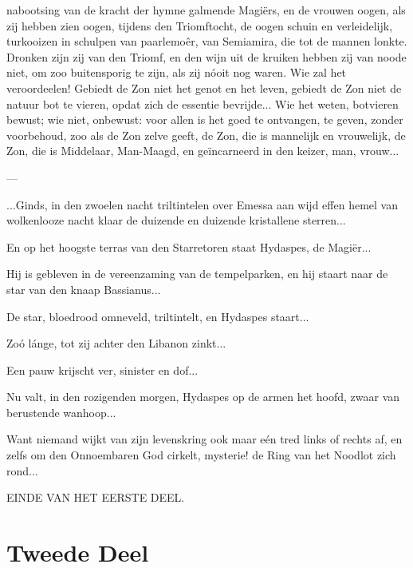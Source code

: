 \documentclass[a4paper, 12pt, oneside, dutch]{article}
\begin{document}
nabootsing van de kracht der hymne galmende Magiërs, en de vrouwen oogen, als zij hebben zien oogen, tijdens den Triomftocht, de oogen schuin en verleidelijk, turkooizen in schulpen van paarlemoêr, van Semiamira, die tot de mannen lonkte. Dronken zijn zij van den Triomf, en den wijn uit de kruiken hebben zij van noode niet, om zoo buitensporig te zijn, als zij nóoit nog waren. Wie zal het veroordeelen! Gebiedt de Zon niet het genot en het leven, gebiedt de Zon niet de natuur bot te vieren, opdat zich de essentie bevrijde... Wie het weten, botvieren bewust; wie niet, onbewust: voor allen is het goed te ontvangen, te geven, zonder voorbehoud, zoo als de Zon zelve geeft, de Zon, die is mannelijk en vrouwelijk, de Zon, die is Middelaar, Man-Maagd, en geïncarneerd in den keizer, man, vrouw...

---

...Ginds, in den zwoelen nacht triltintelen over Emessa aan wijd effen hemel van wolkenlooze nacht klaar de duizende en duizende kristallene sterren...

En op het hoogste terras van den Starretoren staat Hydaspes, de Magiër...

Hij is gebleven in de vereenzaming van de tempelparken, en hij staart naar de star van den knaap Bassianus...

De star, bloedrood omneveld, triltintelt, en Hydaspes staart...

Zoó lánge, tot zij achter den Libanon zinkt...

Een pauw krijscht ver, sinister en dof...

Nu valt, in den rozigenden morgen, Hydaspes op de armen het hoofd, zwaar van berustende wanhoop...

Want niemand wijkt van zijn levenskring ook maar eén tred links of rechts af, en zelfs om den Onnoembaren God cirkelt, mysterie! de Ring van het Noodlot zich rond...

EINDE VAN HET EERSTE DEEL.
\clearpage
\section{Tweede Deel}
\subsection{}
\end{document}
